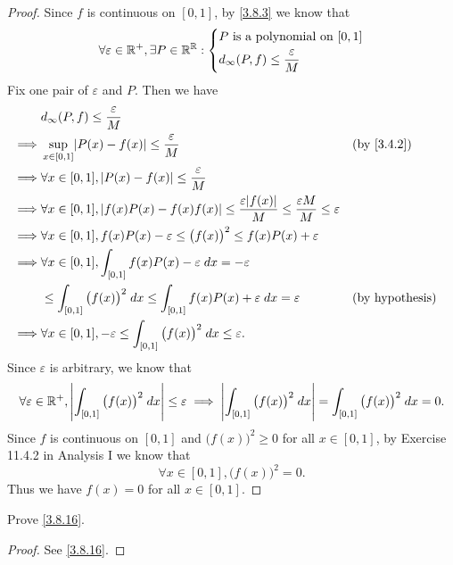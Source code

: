 \begin{proof}
  Since \(f\) is continuous on \([0, 1]\), by \cref{3.8.3} we know that
  \[
    \forall \varepsilon \in \mathbb{R}^+, \exists P \in \mathbb{R}^{\mathbb{R}} : \begin{dcases}
      P \text{ is a polynomial on } [0, 1] \\
      d_{\infty}(P, f) \leq \dfrac{\varepsilon}{M}
    \end{dcases}
  \]
  Fix one pair of \(\varepsilon\) and \(P\).
  Then we have
  \begin{align*}
             & d_\infty(P, f) \leq \dfrac{\varepsilon}{M}                                                                                                                          \\
    \implies & \sup_{x \in [0, 1]} \abs{P(x) - f(x)} \leq \dfrac{\varepsilon}{M}                                                                       &  & \by{3.4.2}             \\
    \implies & \forall x \in [0, 1], \abs{P(x) - f(x)} \leq \dfrac{\varepsilon}{M}                                                                                                 \\
    \implies & \forall x \in [0, 1], \abs{f(x) P(x) - f(x) f(x)} \leq \dfrac{\varepsilon \abs{f(x)}}{M} \leq \dfrac{\varepsilon M}{M} \leq \varepsilon                             \\
    \implies & \forall x \in [0, 1], f(x) P(x) - \varepsilon \leq \big(f(x)\big)^2 \leq f(x) P(x) + \varepsilon                                                                    \\
    \implies & \forall x \in [0, 1], \int_{[0, 1]} f(x) P(x) - \varepsilon \; dx = -\varepsilon                                                                                    \\
             & \leq \int_{[0, 1]} \big(f(x)\big)^2 \; dx \leq \int_{[0, 1]} f(x) P(x) + \varepsilon \; dx = \varepsilon                                &  & \text{(by hypothesis)} \\
    \implies & \forall x \in [0, 1], -\varepsilon \leq \int_{[0, 1]} \big(f(x)\big)^2 \; dx \leq \varepsilon.
  \end{align*}
  Since \(\varepsilon\) is arbitrary, we know that
  \[
    \forall \varepsilon \in \mathbb{R}^+, \left\lvert\int_{[0, 1]} \big(f(x)\big)^2 \; dx\right\rvert \leq \varepsilon \implies \left\lvert\int_{[0, 1]} \big(f(x)\big)^2 \; dx\right\rvert = \int_{[0, 1]} \big(f(x)\big)^2 \; dx = 0.
  \]
  Since \(f\) is continuous on \([0, 1]\) and \(\big(f(x)\big)^2 \geq 0\) for all \(x \in [0, 1]\), by Exercise 11.4.2 in Analysis I we know that
  \[
    \forall x \in [0, 1], \big(f(x)\big)^2 = 0.
  \]
  Thus we have \(f(x) = 0\) for all \(x \in [0, 1]\).
\end{proof}

\begin{ex}\label{ex:3.8.9}
  Prove \cref{3.8.16}.
\end{ex}

\begin{proof}
  See \cref{3.8.16}.
\end{proof}
